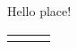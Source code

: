 \documentclass[12pt, english]{article}
\begin{document}
Hello {{place}}!
\vspace{1cm}\\
\begin{tabular}{ccc}
{%
{%
{%
{%
{%
{%
{%
{%
{%
{%
\end{tabular}
\end{document}
